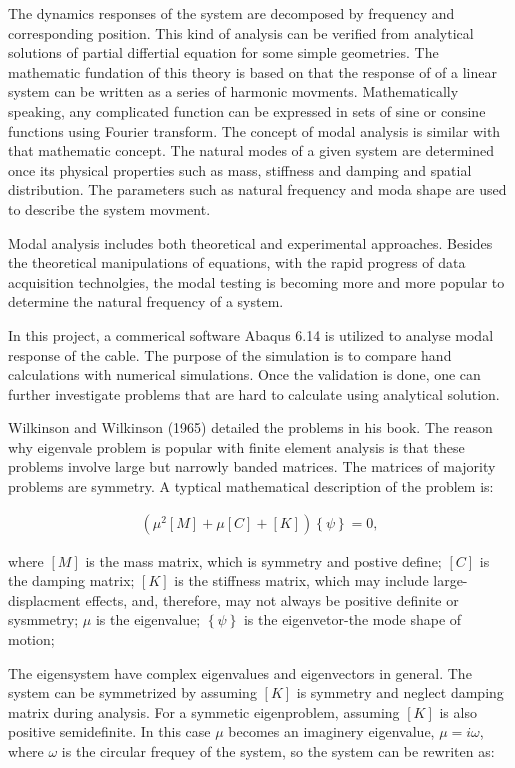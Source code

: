 \documentclass[paper=a4, fontsize=11pt]{scrartcl} %
\numberwithin{equation}{section} %
\numberwithin{figure}{section} %
\numberwithin{table}{section} %
\begin{document}
The dynamics responses of the system are decomposed by frequency and
corresponding position. This kind of analysis can be verified from
analytical solutions of partial differtial equation for some simple
geometries. The mathematic fundation of this theory is based on that
the response of of a linear system can be written as a series of
harmonic movments. Mathematically speaking, any complicated function
can be expressed in sets of sine or consine functions using Fourier
transform. The concept of modal analysis is similar with that
mathematic concept. The natural modes of a given system are determined
once its physical properties such as mass, stiffness and damping and
spatial distribution. The parameters such as natural frequency and
moda shape are used to describe the system movment.

Modal analysis includes both theoretical and experimental approaches.
Besides the theoretical manipulations of equations, with the rapid
progress of data acquisition technolgies, the modal testing is becoming
more and more popular to determine the natural frequency of a system.

In this project, a commerical software Abaqus 6.14 is utilized to
analyse modal response of the cable. The purpose of the simulation is
to compare hand calculations with numerical simulations. Once the
validation is done, one can further investigate problems that are hard
to calculate using analytical solution.

Wilkinson and Wilkinson (1965) detailed the problems in his book. The
reason why eigenvale problem is popular with finite element analysis
is that these problems involve large but narrowly banded matrices. The
matrices of majority problems are symmetry. A typtical mathematical
description of the problem is:

\begin{align}
\left(\mu^2\left[M\right]+\mu\left[C\right]+\left[K\right]\right)\left\{\psi\right\}=0,
\end{align}

where $[M]$ is the mass matrix, which is symmetry and postive define;
$[C]$ is the damping matrix; $[K]$ is the stiffness matrix, which may
include large-displacment effects, and, therefore, may not always be
positive definite or sysmmetry; $\mu$ is the eigenvalue;
$\left\{\psi\right\}$ is the eigenvetor-the mode shape of motion;

The eigensystem have complex eigenvalues and eigenvectors in general.
The system can be symmetrized by assuming $[K]$ is symmetry and neglect
damping matrix during analysis. For a symmetic eigenproblem, assuming
$[K]$ is also positive semidefinite. In this case $\mu$ becomes an
imaginery eigenvalue, $\mu=i\omega$, where $\omega$ is the circular
frequey of the system, so the system can be rewriten as:
\end{document}

